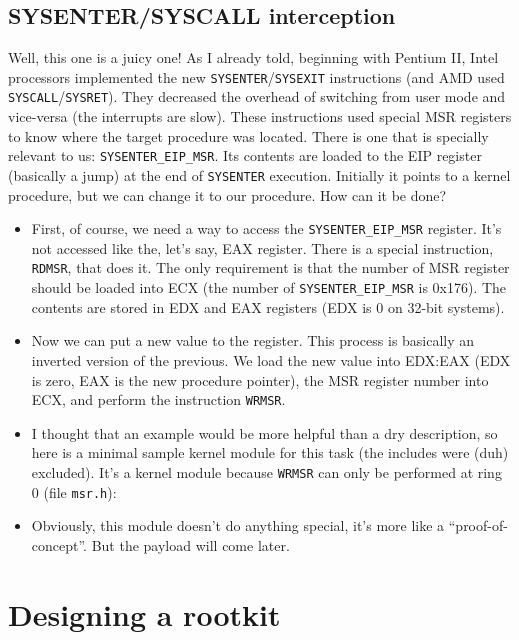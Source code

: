 \documentclass[12pt]{article}
\begin{document}
  \subsection{SYSENTER/SYSCALL interception}
  Well, this one is a juicy one! As I already told, beginning with
  Pentium II, Intel processors implemented the new
  \verb!SYSENTER!/\verb!SYSEXIT!  instructions (and AMD used
  \verb!SYSCALL!/\verb!SYSRET!). They decreased the overhead of
  switching from user mode and vice-versa (the interrupts are
  slow). These instructions used special MSR registers to know where
  the target procedure was located. There is one that is specially
  relevant to us: \verb!SYSENTER_EIP_MSR!. Its contents are loaded to
  the EIP register (basically a jump) at the end of \verb!SYSENTER!
  execution. Initially it points to a kernel procedure, but we can
  change it to our procedure. How can it be done?
  \begin{itemize}
    \item First, of course, we need a way to access the
      \verb!SYSENTER_EIP_MSR! register. It's not accessed like the,
      let's say, EAX register. There is a special instruction,
      \verb!RDMSR!, that does it. The only requirement is that the
      number of MSR register should be loaded into ECX (the number of
      \verb!SYSENTER_EIP_MSR! is 0x176). The contents are stored in
      EDX and EAX registers (EDX is 0 on 32-bit systems).
      
    \item Now we can put a new value to the register. This process is
      basically an inverted version of the previous. We load the new value
      into EDX:EAX (EDX is zero, EAX is the new procedure pointer), the MSR
      register number into ECX, and perform the instruction \verb!WRMSR!.
  
    \item I thought that an example would be more helpful than a dry
      description, so here is a minimal sample kernel module for this
      task (the includes were (duh) excluded). It's a kernel module
      because \verb!WRMSR!  can only be performed at ring 0 (file
      \verb!msr.h!): 
      
    \item Obviously, this module doesn't do anything special, it's more like a
      ``proof-of-concept''. But the payload will come later.
  \end{itemize}

  \section{Designing a rootkit}
  
\end{document}
